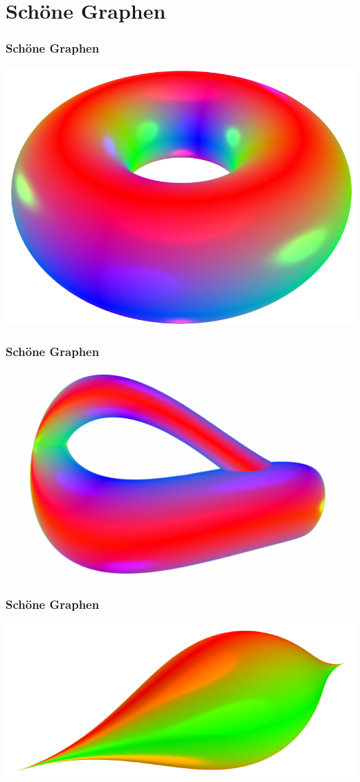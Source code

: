 \documentclass{beamer}
\begin{document}
\section{Sch\"one Graphen}
\begin{frame}\frametitle{Sch\"one Graphen}
 \includegraphics[height=0.8\textheight]{images/graphs/donut.png}
\end{frame}
\begin{frame}\frametitle{Sch\"one Graphen}
\includegraphics[height=0.8\textheight]{images/graphs/kleinsche_flasche.png}
\end{frame}
\begin{frame}\frametitle{Sch\"one Graphen}
\includegraphics[height=0.5\textheight]{images/graphs/limette.png}
\end{frame}
\end{document}
